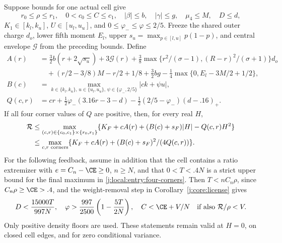 \begin{lemma}\label{j:local:entry:cell-theorem}\label{j:local:entry:corners}
Suppose bounds for one actual cell give
\[
 r_0\le\rho\le r_1,\quad0<c_0\le C\le c_1,\quad
 |\beta|\le b,\quad |\gamma|\le g,\quad \mu_4\le M,\quad D\le d,
\]
$K_1\in[k_l,k_u]$, $U\in[u_l,u_u]$, and
$0\le\varphi_-\le\varphi\le2/5$. Freeze the shared outer charge $d_o$,
lower fifth moment $E_l$, upper $s_u=\max_{p\in[l,u]}p(1-p)$, and
central envelope $\mathcal G$ from the preceding bounds.
Define
\begin{align*}
 A(r)&=\tfrac32 b(r+2\sqrt{s_u})+3\mathcal G(r)
 +\tfrac38\max\{r^2/(\sigma-1),(R-r)^2/(\sigma+1)\}d_o\\
 &\quad +(r/2-3/8)M-r/2+1/8+\tfrac32bg
 -\tfrac14\max\{0,E_l-3M/2+1/2\},\\
 B(c)&=\max_{k\in\{k_l,k_u\},\,u\in\{u_l,u_u\},\,
                      \psi\in\{\varphi_-,2/5\}}|ck+\psi u|,\\
 Q(c,r)&=cr+\tfrac12\varphi_-(3.16r-3-d)
       -\tfrac12(2/5-\varphi_-)(d-.16)_+.
\end{align*}
If all four corner values of $Q$ are positive, then, for every real $H$,
\begin{align}
 \mathcal R&\le\max_{(c,r)\in\{c_0,c_1\}\times\{r_0,r_1\}}
       \{K_F+cA(r)+(B(c)+s_F)|H|-Q(c,r)H^2\}\notag\\
 &\le\max_{c,r\text{ corners}}
       \{K_F+cA(r)+(B(c)+s_F)^2/(4Q(c,r))\}.           \label{j:local:entry:four-corners}
\end{align}
For the following feedback, assume in addition that the cell contains a
ratio extremizer with $e=C_n-\CE\ge0$, $n\ge N$, and that
$0<T<.4N$ is a strict upper bound for the final maximum in
\eqref{j:local:entry:four-corners}. Then $T<nC_n\rho$, since
$C_n\rho\ge\CE>.4$, and the weight-removal step in
Corollary~\ref{j:core:license} gives
\begin{equation}\label{j:local:entry:feedback-values}
 D<\frac{15000T}{997N},\quad
 \varphi>\frac{997}{2500}\left(1-\frac{5T}{2N}\right),\quad
 C<\CE+V/N\quad\text{if also }\cR/\rho<V.
\end{equation}
Only positive density floors are used. These statements remain valid at
$H=0$, on closed cell edges, and for zero conditional variance.
\end{lemma}
